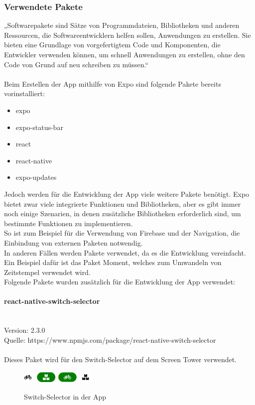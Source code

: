 \subsubsection{Verwendete Pakete}
„Softwarepakete sind Sätze von Programmdateien, Bibliotheken und anderen Ressourcen, die Softwareentwicklern helfen sollen, Anwendungen zu erstellen. Sie bieten eine Grundlage von vorgefertigtem Code und Komponenten, die Entwickler verwenden können, um schnell Anwendungen zu erstellen, ohne den Code von Grund auf neu schreiben zu müssen.“  \\ \\
Beim Erstellen der App mithilfe von Expo sind folgende Pakete bereits vorinstalliert:\\
\begin{itemize}
  \item expo
  \item expo-status-bar
  \item react
  \item react-native
  \item expo-updates
\end{itemize}
Jedoch werden für die Entwicklung der App viele weitere Pakete benötigt. Expo bietet zwar viele integrierte Funktionen und Bibliotheken, aber es gibt immer noch einige Szenarien, in denen zusätzliche Bibliotheken erforderlich sind, um bestimmte Funktionen zu implementieren.\\
So ist zum Beispiel für die Verwendung von Firebase und der Navigation, die Einbindung von externen Paketen notwendig.\\
In anderen Fällen werden Pakete verwendet, da es die Entwicklung vereinfacht. Ein Beispiel dafür ist das Paket Moment, welches zum Umwandeln von Zeitstempel verwendet wird.\\
Folgende Pakete wurden zusätzlich für die Entwicklung der App verwendet:\\


\paragraph{react-native-switch-selector}\mbox{}\\
Version: 2.3.0\\ Quelle: https://www.npmjs.com/package/react-native-switch-selector\\ \\
Dieses Paket wird für den Switch-Selector auf dem Screen Tower verwendet. \\
\begin{figure}[H]
  \centering
  \includegraphics[width=0.15\textwidth]{images/app-screenshots/switchselector.png}
  \includegraphics[width=0.15\textwidth]{images/app-screenshots/switchselector2.png}
  \caption{Switch-Selector in der App}
  \label{fig:switchselector}
\end{figure}

